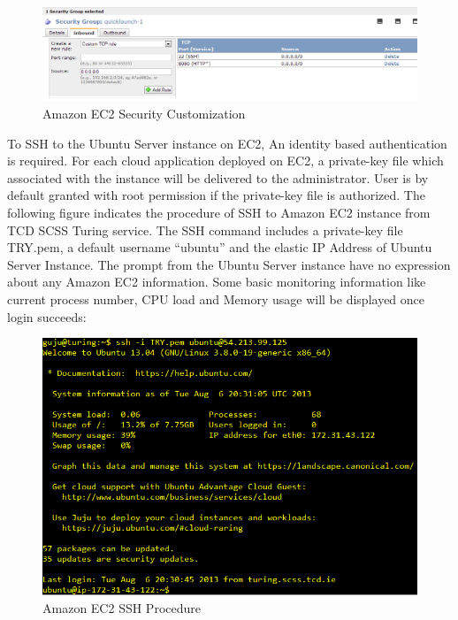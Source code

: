 \begin{figure}[h]
        \centering
        \includegraphics[width=1.0\textwidth]{figures/Amazon_EC2_Security_Group_Customization.png}
        \caption[Amazon EC2 Security Customization] {Amazon EC2 Security Customization}
\end{figure}

To SSH to the Ubuntu Server instance on EC2, An identity based authentication is required. For each cloud application deployed on EC2, a private-key file which associated with the instance will be delivered to the administrator. User is by default granted with root permission if the private-key file is authorized. The following figure indicates the procedure of SSH to Amazon EC2 instance from TCD SCSS Turing service. The SSH command includes a private-key file TRY.pem, a default username ``ubuntu'' and the elastic IP Address of Ubuntu Server Instance. The prompt from the Ubuntu Server instance have no expression about any Amazon EC2 information. Some basic monitoring information like current process number, CPU load and Memory usage will be displayed once login succeeds:

\begin{figure}[h]
        \centering
        \includegraphics[width=1.0\textwidth]{figures/Amazon_EC2_Instance_SSH_Procedure.png}
        \caption[Amazon EC2 SSH Procedure] {Amazon EC2 SSH Procedure}
\end{figure}

